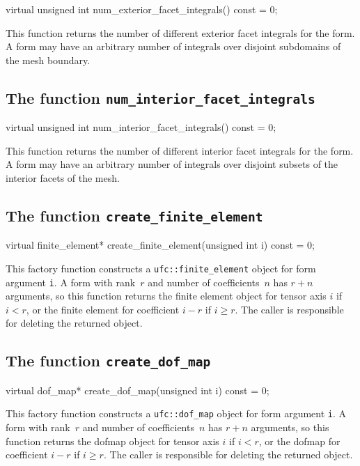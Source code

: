 \begin{code}
virtual unsigned int num_exterior_facet_integrals() const = 0;
\end{code}

This function returns the number of different exterior facet integrals
for the form. A form may have an arbitrary number of integrals over
disjoint subdomains of the mesh boundary.

\subsection{The function \texttt{num\_interior\_facet\_integrals}}

\begin{code}
virtual unsigned int num_interior_facet_integrals() const = 0;
\end{code}

This function returns the number of different interior facet integrals
for the form. A form may have an arbitrary number of integrals over
disjoint subsets of the interior facets of the mesh.

\subsection{The function \texttt{create\_finite\_element}}

\begin{code}
virtual finite_element*
create_finite_element(unsigned int i) const = 0;
\end{code}

This factory function constructs a \texttt{ufc::finite\_element}
object for form argument \texttt{i}. A form with rank~$r$ and number
of coefficients~$n$ has $r + n$ arguments, so this function returns
the finite element object for tensor axis $i$ if $i < r$, or the
finite element for coefficient $i - r$ if $i \geq r$.  The caller is
responsible for deleting the returned object.

\subsection{The function \texttt{create\_dof\_map}}

\begin{code}
virtual dof_map*
create_dof_map(unsigned int i) const = 0;
\end{code}

This factory function constructs a \texttt{ufc::dof\_map} object for
form argument \texttt{i}. A form with rank~$r$ and number of
coefficients~$n$ has $r + n$ arguments, so this function returns the
dofmap object for tensor axis $i$ if $i < r$, or the dofmap for
coefficient $i - r$ if $i \geq r$.  The caller is responsible for
deleting the returned object.

